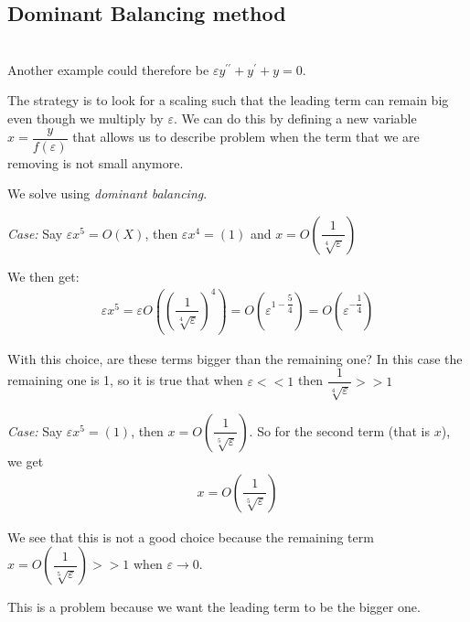 \subsection{Dominant Balancing method}\hfill\\

Another example could therefore be $\varepsilon y^{\prime\prime}+y^{\prime}+y=0$.
\par\bigskip
\noindent The strategy is to look for a scaling such that the leading term can remain big even though we multiply by $\varepsilon$. We can do this by defining a new variable $x = \dfrac{y}{f(\varepsilon)}$ that allows us to describe problem when the term that we are removing is not small anymore.
\par\bigskip
\noindent We solve using \textit{dominant balancing}. \par
\noindent\textit{Case:} Say $\varepsilon x^5 = O(X)$, then $\varepsilon x^4 = (1)$ and $x = O\left(\dfrac{1}{\sqrt[4]{\varepsilon}}\right)$\par
\noindent We then get:
\begin{equation*}
  \begin{gathered}
    \varepsilon x^5 = \varepsilon O\left(\left(\dfrac{1}{\sqrt[4]{\varepsilon}}\right)^4\right) = O\left(\varepsilon^{1-\dfrac{5}{4}}\right) = O\left(\varepsilon^{-\dfrac{1}{4}}\right)
  \end{gathered}
\end{equation*}
\par\bigskip
\noindent With this choice, are these terms bigger than the remaining one? In this case the remaining one is 1, so it is true that when $\varepsilon<<1$ then $\dfrac{1}{\sqrt[4]{\varepsilon}}>>1$
\par\bigskip
\noindent\textit{Case:} Say $\varepsilon x^5 = (1)$, then $x = O\left(\dfrac{1}{\sqrt[5]{\varepsilon}}\right)$. So for the second term (that is $x$), we get
\begin{equation*}
  \begin{gathered}
    x = O\left(\dfrac{1}{\sqrt[5]{\varepsilon}}\right)
  \end{gathered}
\end{equation*}
\par\bigskip
\noindent We see that this is not a good choice because the remaining term $x = O\left(\dfrac{1}{\sqrt[5]{\varepsilon}}\right)>>1$ when $\varepsilon\to0$.\par
\noindent This is a problem  because we want the leading term to be the bigger one.
\par\bigskip
